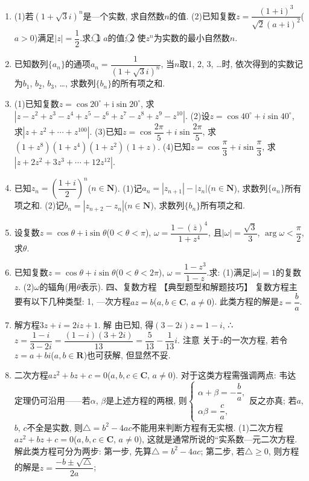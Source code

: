 \documentclass[10pt,a4paper]{article}
\begin{document}
\begin{enumerate}[1.]
\item (1)若$(1+\sqrt 3i)^n$是—个实数, 求自然数$n$的值.
(2)已知复数$z=\dfrac{{{(1+\mathrm{i})}^3}}{\sqrt 2{{(a+\mathrm{i})}^2}}$($a>0$)满足$|z|=\dfrac 12$.求:
\textcircled{1} $a$的值; 								\textcircled{2} 使$z^n$为实数的最小自然数$n$.
\item 已知数列$\{a_n\}$的通项$a_n=\dfrac 1{(1+\sqrt 3i)^n}$, 当$n$取1, 2, 3, …时, 依次得到的实数记为$b_1$, $b_2$, $b_3$, …, 求数列$\{b_n\}$的所有项之和.
\item (1)已知复数$z=\cos 20^\circ +\mathrm{i}\sin 20^\circ$, 求$|z-z^2+z^3-z^4+z^5-z^6+z^7-z^8+z^9-z^{10}|$.
(2)设$z=\cos 40^\circ +i\sin 40^\circ$, 求$|z+z^2+\cdots +z^{100}|$.
(3)已知$z=\cos \dfrac{2\pi }5+i\sin \dfrac{2\pi }5$, 求$(1+z^8)(1+z^4)(1+z^2)(1+z)$.
(4)已知$z=\cos \dfrac{\pi }3+i\sin \dfrac{\pi }3$, 求$|z+2z^2+3z^3+\cdots +12z^{12}|$.
\item 已知$z_n=(\dfrac{1+i}2)^n$($n\in \mathbf{N}$).
(1)记$a_n=|z_{n+1}|-|z_n|$($n\in \mathbf{N}$), 求数列$\{a_n\}$所有项之和.
(2)记$b_n=|z_{n+2}-z_n|$($n\in \mathbf{N}$), 求数列$\{b_n\}$所有项之和.
\item 设复数$z=\cos \theta +\mathrm{i}\sin \theta$($0<\theta <\pi$), $\omega =\dfrac{1-{{({\overline z})}^4}}{1+{z^4}}$, 且$|\omega|=\dfrac{\sqrt 3}3$, $\arg \omega <\dfrac{\pi }2$, 求$\theta$.
\item 已知复数$z=\cos \theta +i\sin \theta$($0<\theta <2\pi$), $\omega =\dfrac{1-{z^3}}{1-z}$.求:
(1)满足$|\omega|=1$的复数$z$.
(2)$\omega$的辐角(用$\theta$表示).
四、复数方程
【典型题型和解题技巧】
复数方程主要有以下几种类型:
1, —次方程$az=b$($a,b\in \mathbf{C}$, $a\ne 0$).
此类方程的解是$z=\dfrac ba$.
\item 解方程$3z+i=2iz+1$.
解  由已知, 得$(3-2i)z=1-i$, ∴$z=\dfrac{1-i}{3-2i}=\dfrac{(1-i)(3+2i)}{13}=\dfrac 5{13}-\dfrac 1{13}i$.
注意  关于$z$的一次方程, 若令$z=a+bi$($a,b\in \mathbf{R}$)也可获解, 但显然不妥.
\item 二次方程$az^2+bz+c=0$($a,b,c\in \mathbf{C}$, $a\ne 0$).
对于这类方程需强调两点:
韦达定理仍可沿用——若$\alpha$, $\beta$是上述方程的两根, 则$\begin{cases} \alpha +\beta =-\dfrac ba, \\ \alpha \beta =\dfrac ca, \end{cases}$反之亦真;
若$a$, $b$, $c$不全是实数, 则$\triangle =b^2-4ac$不能用来判断方程有无实根.
(1)二次方程$az^2+bz+c=0$($a,b,c\in \mathbf{C}$, $a\ne 0$), 这就是通常所说的``实系数—元二次方程.
解此类方程可分为两步:
第一步, 先算$\triangle =b^2-4ac$;
第二步, 若$\triangle \ge 0$, 则方程的解是$z=\dfrac{-b\pm \sqrt {\triangle }}{2a}$;

\end{enumerate}
\end{document}
